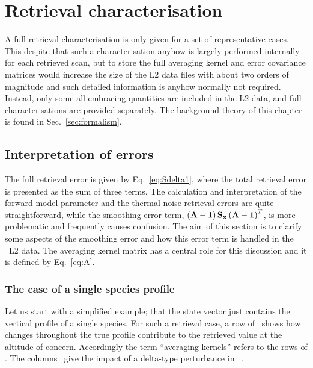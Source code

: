 \chapter{Retrieval characterisation}
\label{chapter:characterisation}
%
A full retrieval characterisation is only given for a set of representative
cases. This despite that such a characterisation anyhow is largely performed
internally for each retrieved scan, but to store the full averaging kernel and
error covariance matrices would increase the size of the L2 data files with
about two orders of magnitude and such detailed information is anyhow normally
not required. Instead, only some all-embracing quantities are included in the
L2 data, and full characterisations are provided separately. The background
theory of this chapter is found in Sec.~\ref{sec:formalism}.
 


\section{Interpretation of errors}
\label{sec:char:interpret}
%
The full retrieval error is given by Eq.~\ref{eq:Sdelta1}, where the total
retrieval error is presented as the sum of three terms. The calculation and
interpretation of the forward model parameter and the thermal noise retrieval
errors are quite straightforward, while the smoothing error term,
$\left(\mathbf{A}-\mathbf{1}\right)\mathbf{S}_{\mathbf{x}}\left(\mathbf{A}-\mathbf{1}\right)^T$,
is more problematic and frequently causes confusion. The aim of this section
is to clarify some aspects of the smoothing error and how this error term is
handled in the \smr\ L2 data. The averaging kernel matrix has a central
role for this discussion and it is defined by Eq.~\ref{eq:A}.


\subsection*{The case of a single species profile}
%
Let us start with a simplified example; that the state vector just contains the
vertical profile of a single species. For such a retrieval case, a row of
\AvrKrnMtr\ shows how changes throughout the true profile contribute to the
retrieved value at the altitude of concern. Accordingly the term ``averaging
kernels'' refers to the rows of \AvrKrnMtr. The columns \AvrKrnMtr\ give the
impact of a delta-type perturbance in \SttVct\ \citep{rodgers:00}.

